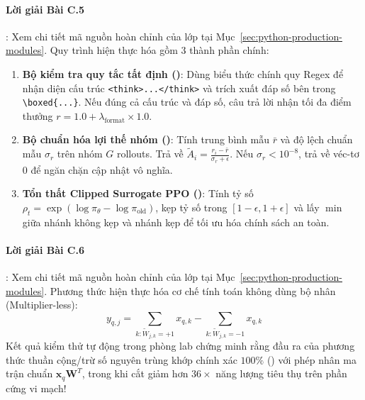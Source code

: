 \paragraph{Lời giải Bài C.5}:
Xem chi tiết mã nguồn hoàn chỉnh của lớp  tại Mục~\ref{sec:python-production-modules}.
Quy trình hiện thực hóa gồm 3 thành phần chính:
\begin{enumerate}
  \item \textbf{Bộ kiểm tra quy tắc tất định ()}: Dùng biểu thức chính quy Regex để nhận diện cấu trúc \verb|<think>...</think>| và trích xuất đáp số bên trong \verb|\boxed{...}|. Nếu đúng cả cấu trúc và đáp số, câu trả lời nhận tối đa điểm thưởng $r = 1.0 + \lambda_{\text{format}} \times 1.0$.
  \item \textbf{Bộ chuẩn hóa lợi thế nhóm ()}: Tính trung bình mẫu $\bar{r}$ và độ lệch chuẩn mẫu $\sigma_r$ trên nhóm $G$ rollouts. Trả về $\widetilde{A}_i = \frac{r_i - \bar{r}}{\sigma_r + \epsilon}$. Nếu $\sigma_r < 10^{-8}$, trả về véc-tơ 0 để ngăn chặn cập nhật vô nghĩa.
  \item \textbf{Tổn thất Clipped Surrogate PPO ()}: Tính tỷ số $\rho_t = \exp(\log \pi_\theta - \log \pi_{\text{old}})$, kẹp tỷ số trong $[1-\epsilon, 1+\epsilon]$ và lấy $\min$ giữa nhánh không kẹp và nhánh kẹp để tối ưu hóa chính sách an toàn.
\end{enumerate}

\paragraph{Lời giải Bài C.6}:
Xem chi tiết mã nguồn hoàn chỉnh của lớp  tại Mục~\ref{sec:python-production-modules}.
Phương thức  hiện thực hóa cơ chế tính toán không dùng bộ nhân (Multiplier-less):
\begin{equation*}
y_{q, j} = \sum_{k: \widetilde{W}_{j,k} = +1} x_{q, k} - \sum_{k: \widetilde{W}_{j,k} = -1} x_{q, k}
\end{equation*}
Kết quả kiểm thử tự động trong phòng lab chứng minh rằng đầu ra của phương thức thuần cộng/trừ số nguyên trùng khớp chính xác $100\%$ () với phép nhân ma trận chuẩn $\mathbf{x}_q \mathbf{W}^T$, trong khi cắt giảm hơn $36\times$ năng lượng tiêu thụ trên phần cứng vi mạch!

